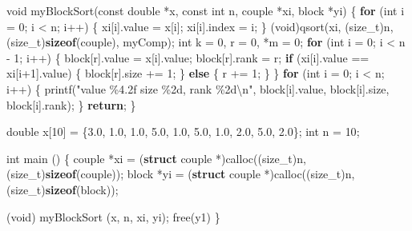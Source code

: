 \documentclass[
  12pt,
]{book}
\newenvironment{Shaded}{\begin{snugshade}}{\end{snugshade}}
\newcommand{\ControlFlowTok}[1]{\textcolor[rgb]{0.13,0.29,0.53}{\textbf{#1}}}
\newcommand{\DataTypeTok}[1]{\textcolor[rgb]{0.13,0.29,0.53}{#1}}
\newcommand{\DecValTok}[1]{\textcolor[rgb]{0.00,0.00,0.81}{#1}}
\newcommand{\FloatTok}[1]{\textcolor[rgb]{0.00,0.00,0.81}{#1}}
\newcommand{\KeywordTok}[1]{\textcolor[rgb]{0.13,0.29,0.53}{\textbf{#1}}}
\newcommand{\NormalTok}[1]{#1}
\newcommand{\SpecialCharTok}[1]{\textcolor[rgb]{0.00,0.00,0.00}{#1}}
\newcommand{\StringTok}[1]{\textcolor[rgb]{0.31,0.60,0.02}{#1}}
\theoremstyle{definition}
\theoremstyle{definition}
\theoremstyle{definition}
\theoremstyle{definition}
\theoremstyle{remark}
\begin{document}
\begin{Shaded}
\begin{Highlighting}[]
\DataTypeTok{void}\NormalTok{ myBlockSort(}\DataTypeTok{const} \DataTypeTok{double}\NormalTok{ *x, }\DataTypeTok{const} \DataTypeTok{int}\NormalTok{ n, couple *xi, block *yi) \{}
    \ControlFlowTok{for}\NormalTok{ (}\DataTypeTok{int}\NormalTok{ i = }\DecValTok{0}\NormalTok{; i \textless{} n; i++) \{}
\NormalTok{        xi[i].value = x[i];}
\NormalTok{        xi[i].index = i;}
\NormalTok{    \}}
\NormalTok{    (}\DataTypeTok{void}\NormalTok{)qsort(xi, (}\DataTypeTok{size\_t}\NormalTok{)n, (}\DataTypeTok{size\_t}\NormalTok{)}\KeywordTok{sizeof}\NormalTok{(couple), myComp);}
    \DataTypeTok{int}\NormalTok{ k = }\DecValTok{0}\NormalTok{, r = }\DecValTok{0}\NormalTok{, *m = }\DecValTok{0}\NormalTok{;}
    \ControlFlowTok{for}\NormalTok{ (}\DataTypeTok{int}\NormalTok{ i = }\DecValTok{0}\NormalTok{; i \textless{} n {-} }\DecValTok{1}\NormalTok{; i++) \{}
\NormalTok{        block[r].value = x[i].value;}
\NormalTok{        block[r].rank = r;}
        \ControlFlowTok{if}\NormalTok{ (xi[i].value == xi[i+}\DecValTok{1}\NormalTok{].value) \{}
\NormalTok{            block[r].size += }\DecValTok{1}\NormalTok{;            }
\NormalTok{        \} }\ControlFlowTok{else}\NormalTok{ \{}
\NormalTok{            r += }\DecValTok{1}\NormalTok{;}
\NormalTok{        \}}
\NormalTok{    \}}
    \ControlFlowTok{for}\NormalTok{ (}\DataTypeTok{int}\NormalTok{ i = }\DecValTok{0}\NormalTok{; i \textless{} n; i++) \{}
\NormalTok{        printf(}\StringTok{"value \%4.2f size \%2d, rank \%2d}\SpecialCharTok{\textbackslash{}n}\StringTok{"}\NormalTok{, }
\NormalTok{            block[i].value, block[i].size, block[i].rank);}
\NormalTok{    \}}
    \ControlFlowTok{return}\NormalTok{;}
\NormalTok{\}}

\DataTypeTok{double}\NormalTok{ x[}\DecValTok{10}\NormalTok{] = \{}\FloatTok{3.0}\NormalTok{, }\FloatTok{1.0}\NormalTok{, }\FloatTok{1.0}\NormalTok{, }\FloatTok{5.0}\NormalTok{, }\FloatTok{1.0}\NormalTok{, }\FloatTok{5.0}\NormalTok{, }\FloatTok{1.0}\NormalTok{, }\FloatTok{2.0}\NormalTok{, }\FloatTok{5.0}\NormalTok{, }\FloatTok{2.0}\NormalTok{\};}
\DataTypeTok{int}\NormalTok{ n = }\DecValTok{10}\NormalTok{;}

\DataTypeTok{int}\NormalTok{ main () \{}
\NormalTok{        couple *xi =}
\NormalTok{        (}\KeywordTok{struct}\NormalTok{ couple *)calloc((}\DataTypeTok{size\_t}\NormalTok{)n, (}\DataTypeTok{size\_t}\NormalTok{)}\KeywordTok{sizeof}\NormalTok{(couple));}
\NormalTok{        block *yi =}
\NormalTok{        (}\KeywordTok{struct}\NormalTok{ couple *)calloc((}\DataTypeTok{size\_t}\NormalTok{)n, (}\DataTypeTok{size\_t}\NormalTok{)}\KeywordTok{sizeof}\NormalTok{(block));}

\NormalTok{    (}\DataTypeTok{void}\NormalTok{) myBlockSort (x, n, xi, yi);}
\NormalTok{    free(y1)}
\NormalTok{\}}
\end{Highlighting}
\end{Shaded}
\end{document}
